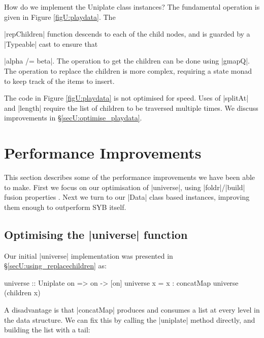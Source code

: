 How do we implement the Uniplate class instances? The fundamental operation is given in Figure \ref{figU:playdata}. The \ignore|repChildren| function descends to each of the child nodes, and is guarded by a |Typeable| cast to ensure that \ignore|alpha /= beta|. The operation to get the children can be done using |gmapQ|. The operation to replace the children is more complex, requiring a state monad to keep track of the items to insert.

The code in Figure \ref{figU:playdata} is not optimised for speed. Uses of |splitAt| and |length| require the list of children to be traversed multiple times. We discuss improvements in \S\ref{secU:optimise_playdata}.


\section{Performance Improvements}
\label{secU:performance}

This section describes some of the performance improvements we have been able to make. First we focus on our optimisation of |universe|, using |foldr|/|build| fusion properties \cite{spj:rules}. Next we turn to our |Data| class based instances, improving them enough to outperform SYB itself.

\subsection{Optimising the |universe| function}
\label{secU:optimise_everything}

Our initial |universe| implementation was presented in \S\ref{secU:using_replacechildren} as:

\begin{code}
universe :: Uniplate on => on -> [on]
universe x = x : concatMap universe (children x)
\end{code}

A disadvantage is that |concatMap| produces and consumes a list at every level in the data structure. We can fix this by calling the |uniplate| method directly, and building the list with a tail:

\begin{onepage}
\end{onepage}


